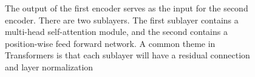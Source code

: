\documentclass[11pt]{article}
\begin{document}
\begin{figure}[H]
    \centering
    \caption*{The output of the first encoder serves as the input for the second encoder. There are two sublayers. The first sublayer contains a multi-head self-attention module, and the second contains a position-wise feed forward network. A common theme in Transformers is that each sublayer will have a residual connection and layer normalization}
\end{figure}
\end{document}
